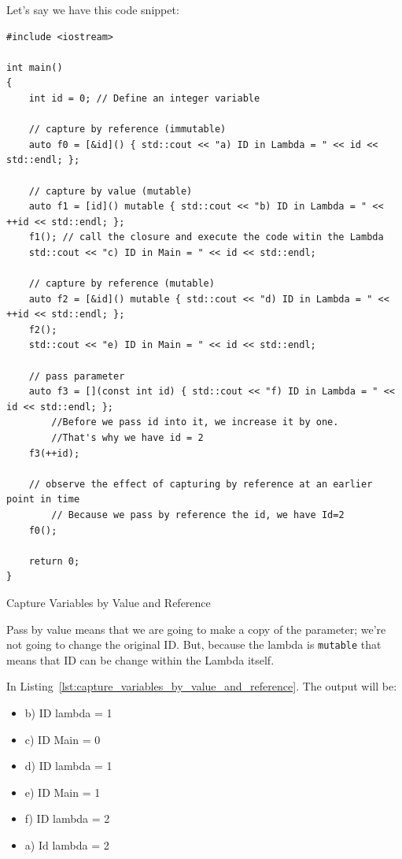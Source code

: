 \documentclass[11pt, a4paper]{article}
\begin{document}
Let's say we have this code snippet:




\begin{listing}
\begin{verbatim}
#include <iostream>

int main()
{
    int id = 0; // Define an integer variable

    // capture by reference (immutable)
    auto f0 = [&id]() { std::cout << "a) ID in Lambda = " << id << std::endl; };

    // capture by value (mutable)
    auto f1 = [id]() mutable { std::cout << "b) ID in Lambda = " << ++id << std::endl; };
    f1(); // call the closure and execute the code witin the Lambda
    std::cout << "c) ID in Main = " << id << std::endl;

    // capture by reference (mutable)
    auto f2 = [&id]() mutable { std::cout << "d) ID in Lambda = " << ++id << std::endl; };
    f2(); 
    std::cout << "e) ID in Main = " << id << std::endl; 

    // pass parameter 
    auto f3 = [](const int id) { std::cout << "f) ID in Lambda = " << id << std::endl; };   
		//Before we pass id into it, we increase it by one.
		//That's why we have id = 2
    f3(++id);

    // observe the effect of capturing by reference at an earlier point in time
		// Because we pass by reference the id, we have Id=2
    f0(); 

    return 0;
}
\end{verbatim}
\caption{Capture Variables by Value and Reference}
\label{lst:capture_variables_by_value_and_reference}
\end{listing}


Pass by value means that we are going to make a copy of the parameter; we're not going to change the original ID. But, because the lambda is \texttt{mutable} that means that ID can be change within the Lambda itself. 


In Listing~\ref{lst:capture_variables_by_value_and_reference}. The output will be:
\begin{itemize}
	\item b) ID lambda = 1
	\item c) ID Main = 0
	\item d) ID lambda = 1
	\item e) ID Main = 1
	\item f) ID lambda = 2
	\item a) Id lambda = 2
\end{itemize}
\end{document}
